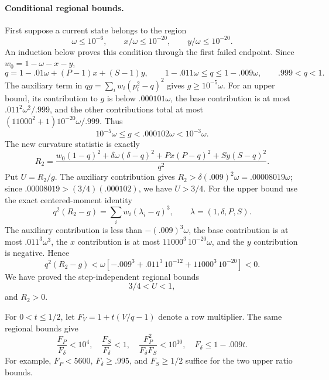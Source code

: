 \paragraph{Conditional regional bounds.}
First suppose a current state belongs to the region
\begin{equation}\label{eq:bsur-region}
 \omega\le10^{-6},\qquad x/\omega\le10^{-20},\qquad y/\omega\le10^{-20}.
\end{equation}
An induction below proves this condition through the first failed endpoint.
Since $w_0=1-\omega-x-y$,
\[
 q=1-.01\omega+(P-1)x+(S-1)y,
 \qquad 1-.011\omega\le q\le1-.009\omega,
 \qquad .999<q<1.
\]
The auxiliary term in $qg=\sum_iw_i(p_i^2-q)^2$ gives
$g\ge10^{-5}\omega$. For an upper bound, its contribution to $g$ is below
$.000101\omega$, the base contribution is at most
$.011^2\omega^2/.999$, and the other contributions total at most
$(11000^2+1)10^{-20}\omega/.999$. Thus
\begin{equation}\label{eq:bsur-g-bounds}
 10^{-5}\omega\le g<.000102\omega<10^{-3}\omega.
\end{equation}
The new curvature statistic is exactly
\[
 R_2=\frac{w_0(1-q)^2+\delta\omega(\delta-q)^2
                 +Px(P-q)^2+Sy(S-q)^2}{q^2}.
\]
Put $U=R_2/g$. The auxiliary contribution gives
$R_2>\delta(.009)^2\omega=.00008019\omega$;
since $.00008019>(3/4)(.000102)$, we have $U>3/4$.
For the upper bound use the exact centered-moment identity
\[
 q^2(R_2-g)=\sum_iw_i(\lambda_i-q)^3,
 \qquad \lambda=(1,\delta,P,S).
\]
The auxiliary contribution is less than $-(.009)^3\omega$, the base contribution
is at most $.011^3\omega^3$, the $x$ contribution is at most
$11000^3\,10^{-20}\omega$, and the $y$ contribution is negative. Hence
\[
 q^2(R_2-g)<\omega[-.009^3+.011^3\,10^{-12}+11000^3\,10^{-20}]<0.
\]
We have proved the step-independent regional bounds
\begin{equation}\label{eq:bsur-ratio-region}
 3/4<U<1,
\end{equation}
and $R_2>0$.

For $0<t\le1/2$, let $F_V=1+t(V/q-1)$ denote a row multiplier. The same
regional bounds give
\begin{equation}\label{eq:bsur-multipliers}
 \frac{F_P}{F_\delta}<10^4,\quad
 \frac{F_S}{F_\delta}<1,\quad
 \frac{F_P^2}{F_\delta F_S}<10^{10},\quad
 F_\delta\le1-.009t.
\end{equation}
For example, $F_P<5600$, $F_\delta\ge.995$, and $F_S\ge1/2$ suffice for the
two upper ratio bounds.

